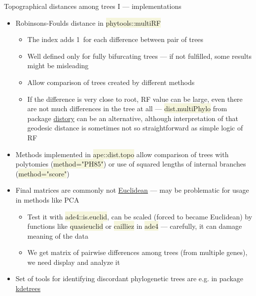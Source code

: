 \documentclass[compress, ucs, xelatex, 11pt, xcolor=svgnames, aspectratio=169,
	hyperref={
		bookmarks=true,
		unicode=true,
		colorlinks=true,
		pdftitle={Molecular data in R},
		plainpages=false,
		pdfauthor={Vojtech Zeisek},
		pdfsubject={Course about phylogeny and evolution in R},
		pdfcreator={XeLaTeX},
		pdfkeywords={R, evolution, phylogeny, molecular data},
		linkcolor=Crimson, %
		anchorcolor=Magenta, %
		citecolor=Magenta, %
		filecolor=Magenta, %
		menucolor=Magenta, %
		urlcolor=DodgerBlue, %
		pdftex},
	url={hyphens, lowtilde} %
	]{beamer}
\renewcommand{\texttt}[1]{\colorbox{Beige}{{\ttfamily #1}}}
\begin{document}
\begin{frame}[allowframebreaks]{Topographical distances among trees I --- implementations}
	\begin{itemize}
		\item Robinsons-Foulds distance in \texttt{phytools::multiRF}
		\begin{itemize}
			\item The index adds 1~for each difference between pair of trees
			\item Well defined only for fully bifurcating trees --- if not fulfilled, some results might be misleading
			\item Allow comparison of trees created by different methods
			\item If the difference is very close to root, RF value can be large, even there are not much differences in the tree at all --- \texttt{dist.multiPhylo} from package \href{https://CRAN.R-project.org/package=distory}{distory} can be an alternative, although interpretation of that geodesic distance is sometimes not so straightforward as simple logic of RF
		\end{itemize}
		\item Methods implemented in \texttt{ape::dist.topo} allow comparison of trees with polytomies (\texttt{method="PH85"}) or use of squared lengths of internal branches (\texttt{method="score"})
		\item Final matrices are commonly not \href{https://en.wikipedia.org/wiki/Euclidean_distance_matrix}{Euclidean} --- may be problematic for usage in methods like PCA
		\begin{itemize}
			\item Test it with \texttt{ade4::is.euclid}, can be scaled (forced to became Euclidean) by functions like \texttt{quasieuclid} or \texttt{cailliez} in \texttt{ade4} --- carefully, it can damage meaning of the data
			\item We get matrix of pairwise differences among trees (from multiple genes), we need display and analyze it
		\end{itemize}
		\item Set of tools for identifying discordant phylogenetic trees are e.g. in package \href{https://CRAN.R-project.org/package=kdetrees}{kdetrees}
	\end{itemize}
\end{frame}
\end{document}
